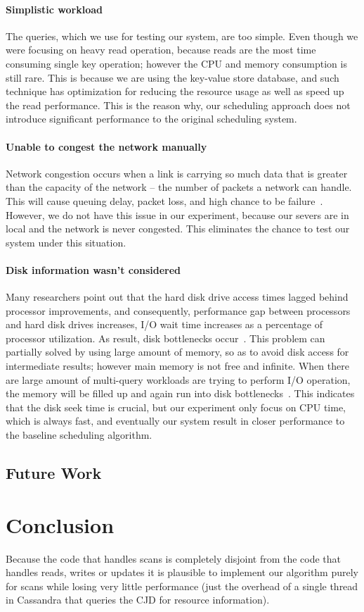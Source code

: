 \paragraph{Simplistic workload}
The queries, which we use for testing our system, are too simple. Even though we were focusing on heavy read operation, because reads are the most time consuming single key operation; however the CPU and memory consumption is still rare. This is because we are using the key-value store database, and such technique has optimization for reducing the resource usage as well as speed up the read performance. This is the reason why, our scheduling approach does not introduce significant performance to the original scheduling system.
 
\paragraph{Unable to congest the network manually}
Network congestion occurs when a link is carrying so much data that is greater than the capacity of the network – the number of packets a network can handle. This will cause queuing delay, packet loss, and high chance to be failure~\cite{103559}. However, we do not have this issue in our experiment, because our severs are in local and the network is never congested. This eliminates the chance to test our system under this situation.
 
\paragraph{Disk information wasn’t considered}
    	Many researchers point out that the hard disk drive access times lagged behind processor improvements, and consequently, performance gap between processors and hard disk drives increases, I/O wait time increases as a percentage of processor utilization. As result, disk bottlenecks occur~\cite{IBM-IO, TMS-SSD}. This problem can partially solved by using large amount of memory, so as to avoid disk access for intermediate results; however main memory is not free and infinite. When there are large amount of multi-query workloads are trying to perform I/O operation, the memory will be filled up and again run into disk bottlenecks~\cite{Bouganim:1998:MSL:288627.288646}. This indicates that the disk seek time is crucial, but our experiment only focus on CPU time, which is always fast, and eventually our system result in closer performance to the baseline scheduling algorithm.

\subsection{Future Work}

\section{Conclusion}
Because the code that handles scans is completely disjoint from the code that handles reads, writes or updates it is plausible to implement our algorithm purely for scans while losing very little performance (just the overhead of a single thread in Cassandra that queries the CJD for resource information).
